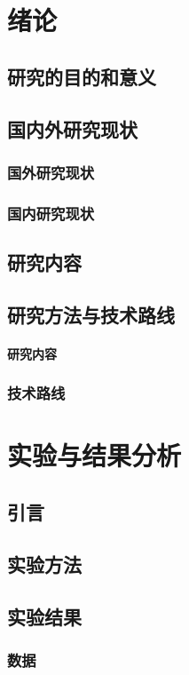\documentclass{ctexbook}%
\begin{document}
	\tableofcontents %

	\chapter{绪论}  %
	\section{研究的目的和意义}
	\section{国内外研究现状}
	\subsection{国外研究现状}
	\subsection{国内研究现状}
	\section{研究内容}
	\section{研究方法与技术路线}
	\subsubsection{研究内容}
	\subsection{技术路线}
	
	 \chapter{实验与结果分析}  %
	 \section{引言}
   	 \section{实验方法}
   	 \section{实验结果}
	 \subsection{数据}
\end{document}
